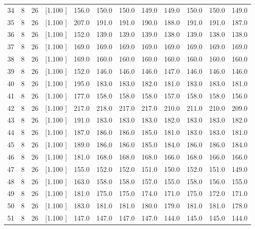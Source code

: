 \documentclass[12pt,a4paper]{article}
\begin{document}
\begin{center}
{\begin{tabular}{r r r r r r r r r r r r}
  34&  8& 26&[1.100     ]&   156.0&   150.0&   150.0&   149.0&   149.0&   150.0&   150.0&   149.0\\[-0.02in]
  35&  8& 26&[1.100     ]&   207.0&   191.0&   191.0&   190.0&   188.0&   191.0&   191.0&   187.0\\[-0.02in]
  36&  8& 26&[1.100     ]&   152.0&   139.0&   139.0&   139.0&   138.0&   139.0&   138.0&   138.0\\[-0.02in]
  37&  8& 26&[1.100     ]&   169.0&   169.0&   169.0&   169.0&   169.0&   169.0&   169.0&   169.0\\[-0.02in]
  38&  8& 26&[1.100     ]&   169.0&   160.0&   160.0&   160.0&   160.0&   160.0&   160.0&   160.0\\[-0.02in]
  39&  8& 26&[1.100     ]&   152.0&   146.0&   146.0&   146.0&   147.0&   146.0&   146.0&   146.0\\[-0.02in]
  40&  8& 26&[1.100     ]&   195.0&   183.0&   183.0&   182.0&   181.0&   183.0&   183.0&   181.0\\[-0.02in]
  41&  8& 26&[1.100     ]&   177.0&   158.0&   158.0&   158.0&   157.0&   158.0&   158.0&   156.0\\[-0.02in]
  42&  8& 26&[1.100     ]&   217.0&   218.0&   217.0&   217.0&   210.0&   211.0&   210.0&   209.0\\[-0.02in]
  43&  8& 26&[1.100     ]&   191.0&   183.0&   183.0&   183.0&   182.0&   183.0&   183.0&   182.0\\[-0.02in]
  44&  8& 26&[1.100     ]&   187.0&   186.0&   186.0&   185.0&   181.0&   183.0&   183.0&   181.0\\[-0.02in]
  45&  8& 26&[1.100     ]&   189.0&   186.0&   186.0&   185.0&   184.0&   186.0&   186.0&   184.0\\[-0.02in]
  46&  8& 26&[1.100     ]&   181.0&   168.0&   168.0&   168.0&   166.0&   168.0&   166.0&   166.0\\[-0.02in]
  47&  8& 26&[1.100     ]&   155.0&   152.0&   152.0&   151.0&   150.0&   152.0&   151.0&   149.0\\[-0.02in]
  48&  8& 26&[1.100     ]&   163.0&   158.0&   158.0&   157.0&   155.0&   158.0&   156.0&   155.0\\[-0.02in]
  49&  8& 26&[1.100     ]&   181.0&   175.0&   175.0&   174.0&   171.0&   175.0&   172.0&   171.0\\[-0.02in]
  50&  8& 26&[1.100     ]&   183.0&   181.0&   181.0&   180.0&   179.0&   181.0&   181.0&   178.0\\[-0.02in]
  51&  8& 26&[1.100     ]&   147.0&   147.0&   147.0&   147.0&   144.0&   145.0&   145.0&   144.0\\[-0.02in]

\end{tabular}}
\end{center}
\end{document}
